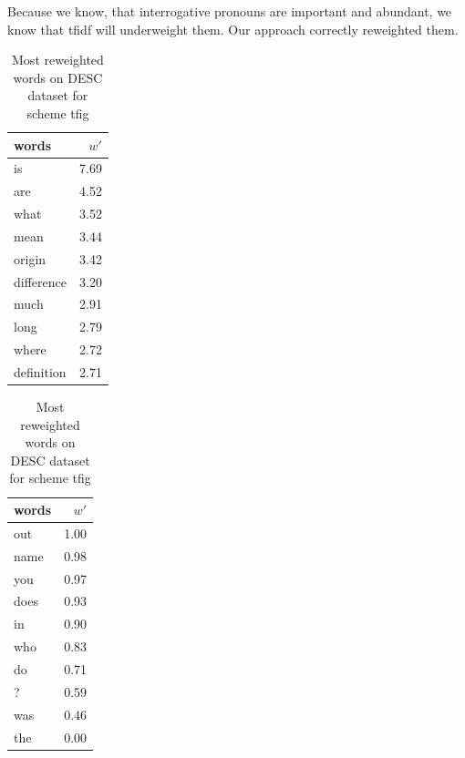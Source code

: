     Because we know, that interrogative pronouns are important and abundant, we know that tfidf will underweight them.
    Our approach correctly reweighted them.
    
    

\begin{table}[H]
    \centering
    \begin{minipage}{.4\linewidth}
      \centering
        \begin{tabular}{lr}
\toprule
      words &  $w'$ \\
\midrule
         is &  7.69 \\
        are &  4.52 \\
       what &  3.52 \\
       mean &  3.44 \\
     origin &  3.42 \\
 difference &  3.20 \\
       much &  2.91 \\
       long &  2.79 \\
      where &  2.72 \\
 definition &  2.71 \\
\bottomrule
\end{tabular}

    \end{minipage}
    \begin{minipage}{.4\linewidth}
      \centering
        \begin{tabular}{lr}
\toprule
words &  $w'$ \\
\midrule
  out &  1.00 \\
 name &  0.98 \\
  you &  0.97 \\
 does &  0.93 \\
   in &  0.90 \\
  who &  0.83 \\
   do &  0.71 \\
    ? &  0.59 \\
  was &  0.46 \\
  the &  0.00 \\
\bottomrule
\end{tabular}

    \end{minipage} 
    \caption{Most reweighted words on DESC dataset for scheme tfig}
    \label{tab:words:TREC:tfig}
\end{table}

